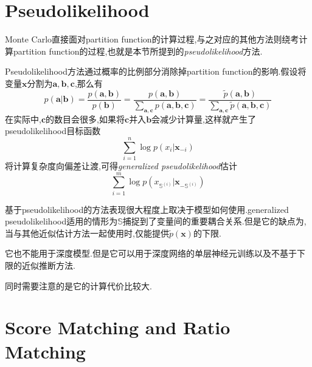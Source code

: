 \section{Pseudolikelihood}

Monte Carlo直接面对partition function的计算过程,与之对应的其他方法则绕考计算partition function的过程,也就是本节所提到的\textit{pseudolikelihood}方法.

Pseudolikelihood方法通过概率的比例部分消除掉partition function的影响.假设将变量$\mathbf x$分割为$\mathbf a, \mathbf b, \mathbf c$,那么有
\begin{equation}
p(\mathbf a|\mathbf b)=\frac{p(\mathbf{a,b})}{p(\mathbf b)}=\frac{p(\mathbf{a,b})}{\sum_{\mathbf{a,c}}p(\mathbf {a,b,c})}=\frac{\tilde p(\mathbf{a,b})}{\sum_{\mathbf{a,c}}\tilde p(\mathbf {a,b,c})}
\end{equation}
在实际中,$\mathbf c$的数目会很多,如果将$\mathbf c$并入$\mathbf b$会减少计算量,这样就产生了pseudolikelihood目标函数
\begin{equation}
\sum_{i=1}^n\log p(x_i|\mathbf x_{-i})
\end{equation}
将计算复杂度向偏差让渡,可得\textit{generalized pseudolikelihood}估计
\begin{equation}
\sum_{i=1}^m\log p(x_{\mathbb S^{(i)}}|\mathbf x_{-{\mathbb S^{(i)}}})
\end{equation}

基于pseudolikelihood的方法表现很大程度上取决于模型如何使用.generalized pseudolikelihood适用的情形为$\mathbb S$捕捉到了变量间的重要耦合关系.但是它的缺点为,当与其他近似估计方法一起使用时,仅能提供$\tilde p(\mathbf x)$的下限.

它也不能用于深度模型.但是它可以用于深度网络的单层神经元训练以及不基于下限的近似推断方法.

同时需要注意的是它的计算代价比较大.

\section{Score Matching and Ratio Matching}

